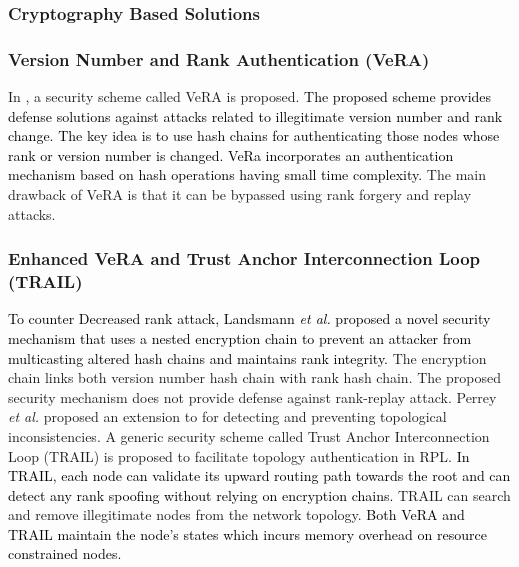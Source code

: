 \documentclass[10pt,journal,sort & compress]{IEEEtran}
\begin{document}
\subsubsection{Cryptography Based Solutions}

\subsubsection*{Version Number and Rank Authentication (VeRA)}
In \cite{Dvir2011}, a security scheme called VeRA is proposed. \textcolor{black}{The proposed scheme provides defense solutions against attacks related to illegitimate version number and rank change. The key idea is to use hash chains for authenticating those nodes whose rank or version number is changed. VeRa incorporates an authentication mechanism based on hash operations having small time complexity.} The main drawback of VeRA is that it can be bypassed using rank forgery and replay attacks. 


\subsubsection*{Enhanced VeRA and Trust Anchor Interconnection Loop (TRAIL)}
\textcolor{black}{To counter Decreased rank attack, Landsmann \textit{et al.} \cite{landsmann2013topology} proposed a novel security mechanism that uses a nested encryption chain to prevent an attacker from multicasting altered hash chains and maintains rank integrity.} The encryption chain links both version number hash chain with rank hash chain. The proposed security mechanism does not provide defense against rank-replay attack. Perrey \textit{et al.} \cite{PerreyLUSW13} proposed an extension to \cite{landsmann2013topology} for detecting and preventing topological inconsistencies. A generic security scheme called Trust Anchor Interconnection Loop (TRAIL) is proposed to facilitate topology authentication in RPL. \textcolor{black}{In TRAIL, each node can validate its upward routing path towards the root and can detect any rank spoofing without relying on encryption chains.} TRAIL can search and remove illegitimate nodes from the network topology. \textcolor{black}{Both VeRA and TRAIL maintain the node's states which incurs memory overhead on resource constrained nodes.}
\end{document}
